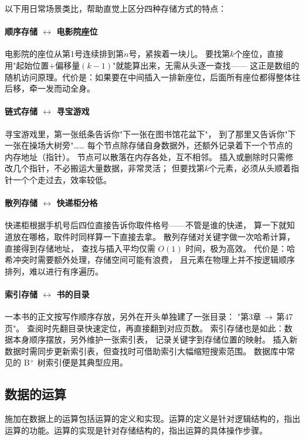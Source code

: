 \documentclass[b5paper,11pt]{article}
\begin{document}
以下用日常场景类比，帮助直觉上区分四种存储方式的特点：

\paragraph{顺序存储 $\leftrightarrow$ 电影院座位}
电影院的座位从第1号连续排到第$n$号，紧挨着一块儿。
要找第$k$个座位，直接用"起始位置$+$偏移量$(k-1)$"就能算出来，无需从头逐一查找——
这正是数组的随机访问原理。代价是：如果要在中间插入一排新座位，后面所有座位都得整体往后移，牵一发而动全身。

\paragraph{链式存储 $\leftrightarrow$ 寻宝游戏}
寻宝游戏里，第一张纸条告诉你"下一张在图书馆花盆下"，
到了那里又告诉你"下一张在操场大树旁"……
每个节点除存储自身数据外，还额外记录着下一个节点的内存地址（指针）。
节点可以散落在内存各处，互不相邻。
插入或删除时只需修改几个指针，不必搬运大量数据，非常灵活；
但要找第$k$个元素，必须从头顺着指针一个个走过去，效率较低。

\paragraph{散列存储 $\leftrightarrow$ 快递柜分格}
快递柜根据手机号后四位直接告诉你取件格号——不管是谁的快递，
算一下就知道放在哪格，取件时同样算一下直接去拿。
散列存储对关键字做一次哈希计算，直接得到存储地址，
查找与插入平均仅需 $O(1)$ 时间，极为高效。
代价是：哈希冲突时需要额外处理，存储空间可能有浪费，
且元素在物理上并不按逻辑顺序排列，难以进行有序遍历。

\paragraph{索引存储 $\leftrightarrow$ 书的目录}
一本书的正文按写作顺序存放，另外在开头单独建了一张目录：
"第3章$\,\rightarrow\,$第47页"。
查阅时先翻目录快速定位，再直接翻到对应页数。
索引存储也是如此：数据本身顺序摆放，另外维护一张索引表，
记录关键字到存储位置的映射。
插入新数据时需同步更新索引表，但查找时可借助索引大幅缩短搜索范围。
数据库中常见的 B$^+$ 树索引便是其典型应用。

\subsection{数据的运算}
施加在数据上的运算包括运算的定义和实现。运算的定义是针对逻辑结构的，指出运算的功能。运算的实现是针对存储结构的，指出运算的具体操作步骤。
\end{document}
